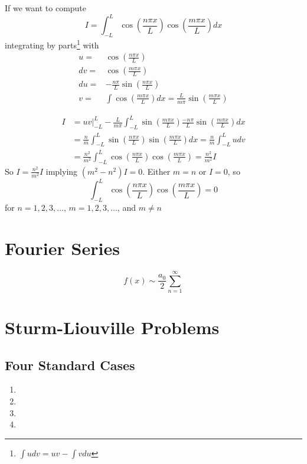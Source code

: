 \documentclass[12pt]{article}
\begin{document}
If we want to compute $$I = \int_{-L}^L \cos \left(\frac{n\pi x}{L}\right) \cos \left( \frac{m\pi x}{L} \right) dx$$ integrating by parts\footnote{$\int u dv = uv - \int v du$} with $$\begin{aligned}
    u  =& \cos \left( \frac{n\pi x}{L} \right)\\
    dv =& \cos \left( \frac{m\pi x}{L} \right)\\
    du =& -\frac{n \pi}{L}\sin \left( \frac{n\pi x}{L} \right)\\
    v  =& \int \cos \left( \frac{m \pi x}{L} \right) dx = \frac{L}{m \pi} \sin \left( \frac{m \pi x}{L} \right)
\end{aligned}$$

$$\begin{aligned}
    I&=uv \bigg\rvert_{-L}^L -\frac{L}{m\pi}\int_{-L}^L \sin \left(\frac{m\pi x}{L} \right) \frac{-n\pi}{L} \sin \left( \frac{m\pi x}{L} \right) dx\\
    &= \frac{n}{m} \int_{-L}^L \sin \left( \frac{n\pi x}{L} \right) \sin \left( \frac{m\pi x}{L} \right) dx = \frac{n}{m} \int_{-L}^L u dv\\
    &= \frac{n^2}{m^2} \int_{-L}^L \cos \left( \frac{n\pi x}{L} \right) \cos \left( \frac{m\pi x}{L} \right) = \frac{n^2}{m^2}I
\end{aligned}$$ So $I = \frac{n^2}{m^2} I$ implying $(m^2 - n^2)I = 0$. Either $m = n$ or $I = 0$, so $$\int_{-L}^L \cos\left( \frac{n\pi x}{L} \right) \cos\left( \frac{m\pi x}{L} \right) = 0$$ for $n = 1, 2, 3, \ldots$, $m = 1, 2, 3, \ldots$, and $m \neq n$

\section{Fourier Series}

$$f(x) \sim \frac{a_0}{2} \sum_{n=1}^{\infty} $$

\section{Sturm-Liouville Problems}

\subsection{Four Standard Cases}

\begin{enumerate}
    \item
    \item
    \item
    \item
\end{enumerate}
\end{document}
